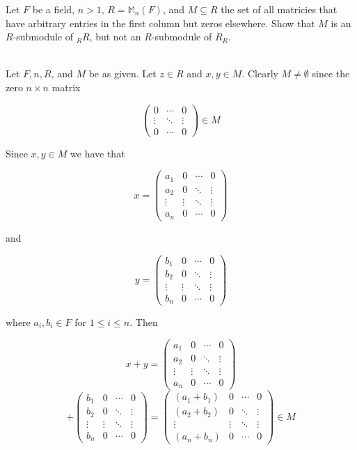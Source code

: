 Let $F$ be a field, $n>1$, $R=\mathbb{M}_n(F)$, and $M\subseteq R$ the set of all matricies that have
arbitrary entries in the first column but zeros elsewhere. Show that $M$ is an $R$-submodule of $ _RR$,
but not an $R$-submodule of $R_R$.

\begin{solution}\renewcommand{\qedsymbol}{}\ \\
    Let $F, n, R$, and $M$ be as given. Let $z\in R$ and $x,y\in M$. Clearly $M\neq\emptyset$ since the
    zero $n\times n$ matrix

    $$\left(\begin{array}{ccc} 0 & \cdots & 0 \\ \vdots & \ddots & \vdots
                            \\ 0 & \cdots & 0 \end{array}\right)\in M$$
    
    Since $x,y\in M$ we have that

    $$x=\left(\begin{array}{cccc} a_1 & 0 & \cdots & 0 \\ a_2 & 0 & \ddots & \vdots
                               \\ \vdots & \vdots & \ddots & \vdots \\ a_n & 0 & \cdots & 0
        \end{array}\right)$$
    
    and

    $$y=\left(\begin{array}{cccc} b_1 & 0 & \cdots & 0 \\ b_2 & 0 & \ddots & \vdots
                               \\ \vdots & \vdots & \ddots & \vdots \\ b_n & 0 & \cdots & 0
        \end{array}\right)$$
    
    where $a_i,b_i\in F$ for $1\leq i\leq n$. Then

    $$x+y=\left(\begin{array}{cccc} a_1 & 0 & \cdots & 0 \\ a_2 & 0 & \ddots & \vdots
                                 \\ \vdots & \vdots & \ddots & \vdots \\ a_n & 0 & \cdots & 0
          \end{array}\right)$$
    $$+\left(\begin{array}{cccc} b_1 & 0 & \cdots & 0 \\ b_2 & 0 & \ddots & \vdots
                              \\ \vdots & \vdots & \ddots & \vdots \\ b_n & 0 & \cdots & 0
       \end{array}\right)
      =\left(\begin{array}{cccc} (a_1+b_1) & 0 & \cdots & 0 \\ (a_2+b_2) & 0 & \ddots & \vdots
                              \\ \vdots & \vdots & \ddots & \vdots\\ (a_n+b_n) & 0 & \cdots & 0
       \end{array}\right)\in M$$
    

\end{solution}
